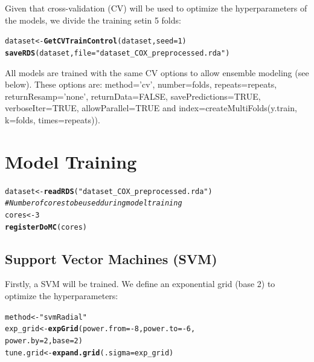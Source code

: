 \documentclass[twoside,a4wide,12pt]{article}\usepackage[]{graphicx}\usepackage[]{color}
\makeatletter
\newcommand{\hlnum}[1]{\textcolor[rgb]{0.686,0.059,0.569}{#1}}%
\newcommand{\hlstr}[1]{\textcolor[rgb]{0.192,0.494,0.8}{#1}}%
\newcommand{\hlcom}[1]{\textcolor[rgb]{0.678,0.584,0.686}{\textit{#1}}}%
\newcommand{\hlopt}[1]{\textcolor[rgb]{0,0,0}{#1}}%
\newcommand{\hlstd}[1]{\textcolor[rgb]{0.345,0.345,0.345}{#1}}%
\newcommand{\hlkwb}[1]{\textcolor[rgb]{0.69,0.353,0.396}{#1}}%
\newcommand{\hlkwc}[1]{\textcolor[rgb]{0.333,0.667,0.333}{#1}}%
\newcommand{\hlkwd}[1]{\textcolor[rgb]{0.737,0.353,0.396}{\textbf{#1}}}%
\newenvironment{kframe}{%
 \def\at@end@of@kframe{}%
 \ifinner\ifhmode%
  \def\at@end@of@kframe{\end{minipage}}%
  \begin{minipage}{\columnwidth}%
 \fi\fi%
 \def\FrameCommand##1{\hskip\@totalleftmargin \hskip-\fboxsep
 \colorbox{shadecolor}{##1}\hskip-\fboxsep
     \hskip-\linewidth \hskip-\@totalleftmargin \hskip\columnwidth}%
 \MakeFramed {\advance\hsize-\width
   \@totalleftmargin\z@ \linewidth\hsize
   \@setminipage}}%
 {\par\unskip\endMakeFramed%
 \at@end@of@kframe}
\newenvironment{knitrout}{}{} %
\makeatother
\begin{document}
Given that cross-validation (CV) will be used to optimize the hyperparameters of the models, we divide the training setin 5 folds:
\begin{knitrout}
\color{fgcolor}\begin{kframe}
\begin{alltt}
\hlstd{dataset} \hlkwb{<-} \hlkwd{GetCVTrainControl}\hlstd{(dataset,} \hlkwc{seed} \hlstd{=} \hlnum{1}\hlstd{)}
\hlkwd{saveRDS}\hlstd{(dataset,} \hlkwc{file} \hlstd{=} \hlstr{"dataset_COX_preprocessed.rda"}\hlstd{)}
\end{alltt}
\end{kframe}
\end{knitrout}

All models are trained with the same CV options to allow ensemble modeling (see below).
These options are:
method='cv', number=folds, repeats=repeats, returnResamp='none',
returnData=FALSE, savePredictions=TRUE,
verboseIter=TRUE, allowParallel=TRUE and
index=createMultiFolds(y.train, k=folds, times=repeats)).

\section{Model Training}

\begin{knitrout}
\color{fgcolor}\begin{kframe}
\begin{alltt}
\hlstd{dataset} \hlkwb{<-} \hlkwd{readRDS}\hlstd{(}\hlstr{"dataset_COX_preprocessed.rda"}\hlstd{)}
\hlcom{# Number of cores to be used during model training}
\hlstd{cores} \hlkwb{<-} \hlnum{3}
\hlkwd{registerDoMC}\hlstd{(cores)}
\end{alltt}
\end{kframe}
\end{knitrout}


\subsection{Support Vector Machines (SVM)}
Firstly, a SVM will be trained\cite{svmreview}. We define an exponential grid (base 2) to optimize the hyperparameters:

\begin{knitrout}
\color{fgcolor}\begin{kframe}
\begin{alltt}
\hlstd{method} \hlkwb{<-} \hlstr{"svmRadial"}
\hlstd{exp_grid} \hlkwb{<-} \hlkwd{expGrid}\hlstd{(}\hlkwc{power.from} \hlstd{=} \hlopt{-}\hlnum{8}\hlstd{,} \hlkwc{power.to} \hlstd{=} \hlopt{-}\hlnum{6}\hlstd{,}
    \hlkwc{power.by} \hlstd{=} \hlnum{2}\hlstd{,} \hlkwc{base} \hlstd{=} \hlnum{2}\hlstd{)}
\hlstd{tune.grid} \hlkwb{<-} \hlkwd{expand.grid}\hlstd{(}\hlkwc{.sigma} \hlstd{= exp_grid)}
\end{alltt}
\end{kframe}
\end{knitrout}
\end{document}
